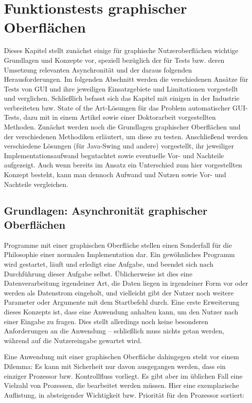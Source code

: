 \chapter{Funktionstests graphischer Oberflächen}\label{chapter:introguitesting}


Dieses Kapitel stellt zunächst einige für graphische Nutzeroberflächen wichtige 
Grundlagen und Konzepte vor, speziell bezüglich der für Tests bzw. deren Umsetzung
relevanten Asynchronität und der daraus folgenden Herausforderungen.
Im folgenden Abschnitt werden die verschiedenen Ansätze für Tests von GUI
und ihre jeweiligen Einsatzgebiete und Limitationen vorgestellt und verglichen.
Schließlich befasst sich das Kapitel mit einigen in der Industrie 
verbreiteten bzw. \glqq{}State of the Art\grqq{}-Lösungen
für das Problem automatischer GUI-Tests, dazu mit in einem Artikel sowie einer Doktorarbeit
vorgestellten Methoden. Zunächst werden noch die Grundlagen graphischer Oberflächen und
der verschiedenen Methodiken erläutert, um diese zu testen.
Anschließend werden verschiedene Lösungen (für Java-Swing und andere) vorgestellt,
ihr jeweiliger Implementationsaufwand begutachtet sowie eventuelle Vor- und Nachteile aufgezeigt.
Auch wenn bereits im Ansatz ein Unterschied zum hier vorgestellten Konzept besteht, kann man dennoch
Aufwand und Nutzen sowie Vor- und Nachteile vergleichen.



\section{Grundlagen: Asynchronität graphischer Oberflächen}


Programme mit einer graphischen Oberfläche stellen einen Sonderfall für
die Philosophie einer normalen Implementation dar. Ein gewöhnliches Programm wird
gestartet, läuft und erledigt eine Aufgabe, und beendet sich nach
Durchführung dieser Aufgabe selbst. Üblicherweise ist dies eine Datenverarbeitung
irgendeiner Art, die Daten liegen in irgendeiner Form vor oder werden 
als Datenstrom eingeholt, und vielleicht gibt der Nutzer noch weitere Parameter
oder Argumente mit dem Startbefehl durch. Eine erste Erweiterung dieses
Konzepts ist, dass eine Anwendung anhalten kann, um den Nutzer nach einer
Eingabe zu fragen. Dies stellt allerdings noch keine besonderen Anforderungen
an die Anwendung -- schließlich muss nichts getan werden, während auf
die Nutzereingabe gewartet wird.

Eine Anwendung mit einer graphischen Oberfläche dahingegen steht vor
einem Dilemma: Es kann mit Sicherheit nur davon ausgegangen werden, dass ein
einziger Prozessor bzw. Kontrollfluss vorliegt. Es gibt aber im üblichen Fall
eine Vielzahl von Prozessen, die bearbeitet werden müssen. Hier eine exemplarische
Auflistung, in absteigender Wichtigkeit bzw. Priorität für den Prozessor
sortiert:

